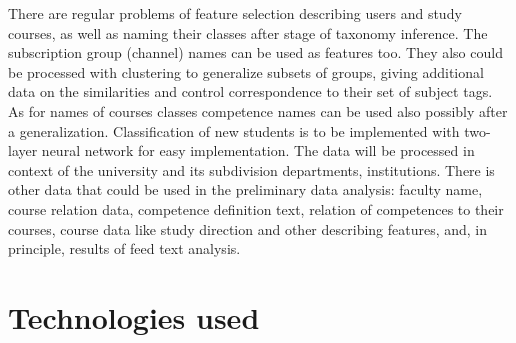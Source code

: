\documentclass[conference]{IEEEtran}
\begin{document}
There are regular problems of feature selection describing users and study courses, as well as naming their classes after stage of taxonomy inference.  The subscription group (channel) names can be used as features too.  They also could be processed with clustering to generalize subsets of groups, giving additional data on the similarities and control correspondence to their set of subject tags.  As for names of courses classes competence names can be used also possibly after a generalization.  Classification of new students is to be implemented with two-layer neural network for easy implementation. The data will be processed in context of the university and its subdivision departments, institutions.  There is other data that could be used in the preliminary data analysis: faculty name, course relation data, competence definition text, relation of competences to their courses, course data like study direction and other describing features, and, in principle, results of feed text analysis.








\section{Technologies used}
\label{sec:tech}
\end{document}
